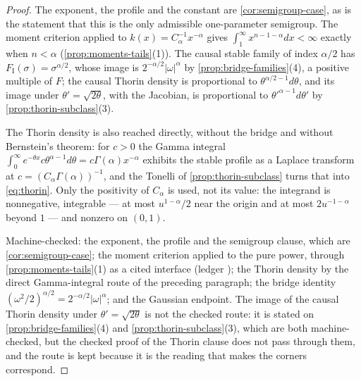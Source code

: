 \begin{proof}\leanok
The exponent, the profile and the constant are \ref{cor:semigroup-case}, as is the statement
that this is the only admissible one-parameter semigroup. The moment criterion applied to
$k(x) = C_\alpha^{-1}x^{-\alpha}$ gives $\int_1^\infty x^{n-1-\alpha}dx < \infty$ exactly when
$n < \alpha$ (\ref{prop:moments-tails}(1)). The causal stable family of index $\alpha/2$ has
$F_{\mathrm I}(\sigma) = \sigma^{\alpha/2}$, whose image is
$2^{-\alpha/2}|\omega|^{\alpha}$ by \ref{prop:bridge-families}(4), a positive multiple of $F$;
the causal Thorin density is proportional to $\theta^{\alpha/2-1}d\theta$, and its image under
$\theta' = \sqrt{2\theta}$, with the Jacobian, is proportional to $\theta'^{\alpha-1}d\theta'$
by \ref{prop:thorin-subclass}(3).

The Thorin density is also reached directly, without the bridge and without
Bernstein's theorem: for $c > 0$ the Gamma integral
$\int_0^\infty e^{-\theta x}c\theta^{\alpha-1}d\theta = c\Gamma(\alpha)x^{-\alpha}$ exhibits the stable
profile as a Laplace transform at $c = (C_\alpha\Gamma(\alpha))^{-1}$, and the Tonelli of
\ref{prop:thorin-subclass} turns that into \ref{eq:thorin}. Only the positivity of
$C_\alpha$ is used, not its value: the integrand is nonnegative, integrable --- at most
$u^{1-\alpha}/2$ near the origin and at most $2u^{-1-\alpha}$ beyond $1$ --- and nonzero on
$(0,1)$.

Machine-checked: the exponent, the profile and the semigroup clause, which are
\ref{cor:semigroup-case}; the moment criterion applied to the pure power, through
\ref{prop:moments-tails}(1) as a cited interface (ledger ); the Thorin density by
the direct Gamma-integral route of the preceding paragraph; the bridge identity
$(\omega^2/2)^{\alpha/2} = 2^{-\alpha/2}|\omega|^\alpha$; and the Gaussian endpoint. The image
of the causal Thorin density under $\theta' = \sqrt{2\theta}$ is not the checked route: it is
stated on \ref{prop:bridge-families}(4) and \ref{prop:thorin-subclass}(3), which are both
machine-checked, but the checked proof of the Thorin clause does not pass through them, and the
route is kept because it is the reading that makes the corners correspond.
\end{proof}

